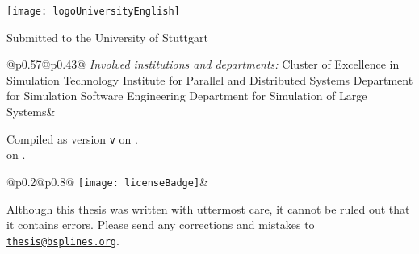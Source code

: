 \thispagestyle{empty}

{%
  \setlength{\parindent}{0pt}%
  \small
  
  \begin{center}
    \texttt{[image: logoUniversityEnglish]}%
    
    \vspace{1em}
    
    Submitted to the University of Stuttgart
  \end{center}
  
  \begin{tabular}{@{}p{0.57\textwidth}@{}p{0.43\textwidth}@{}}
    \emph{Involved institutions and departments:}%
    \vspace{0.6mm}\newline%
    Cluster of Excellence in Simulation Technology%
    \vspace{0.6mm}\newline%
    Institute for Parallel and Distributed Systems%
    \vspace{0.6mm}\newline%
    Department for Simulation Software Engineering%
    \vspace{0.6mm}\newline%
    Department for Simulation of Large Systems&
    \qquad%
    \vspace{2mm}\newline%
    \qquad%
  \end{tabular}
  
  \vfill
  
  Compiled as version \texttt{v\compileCounter{}}
  on \currentTimeLong.\\
  on \gitCommitTimeLong.
  
  \vspace{1em}
  
  \begin{tabular}{%
    @{}p{0.2\textwidth}@{}p{0.8\textwidth}@{}%
  }
    \texttt{[image: licenseBadge]}&
  \end{tabular}
  
  \vspace{1em}
  
  Although this thesis was written with uttermost care,
  it cannot be ruled out that it contains errors.
  Please send any corrections and mistakes to
  \href{mailto:thesis@bsplines.org}{\texttt{thesis@bsplines.org}}.
}

\cleardoublepage
